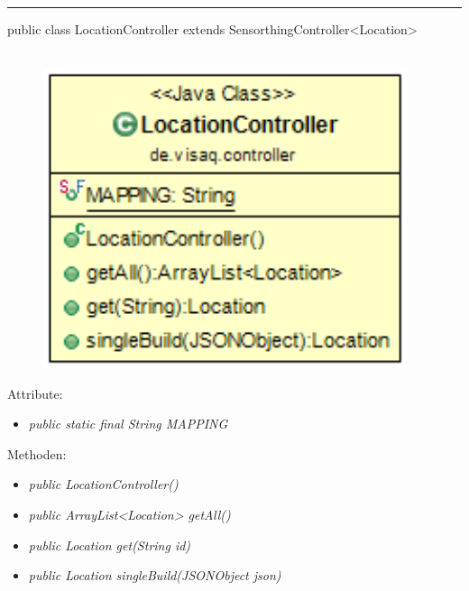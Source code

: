 \rule{\textwidth}{0.4pt}
public class LocationController extends SensorthingController<Location>
\\\\
\begin{minipage}{0.3\textwidth}
    \begin{figure}[H]
        {\centering\includegraphics[width=0.95\textwidth]{media/backend/controller/classes/LocationController.png}}
    \end{figure}
    \end{minipage} \hfill
\begin{minipage}{0.7\textwidth}
\end{minipage}

Attribute:
\begin{itemize}
    \item \emph{public static final String MAPPING} \mappingDescription
\end{itemize}
Methoden:
\begin{itemize}
    \item \emph{public LocationController()}
    \item \emph{public ArrayList<Location> getAll()}
    \extendsSensorthingController
    \item \emph{public Location get(String id)}
    \extendsSensorthingController
    \item \emph{public Location singleBuild(JSONObject json)}
    \extendsSensorthingController
\end{itemize}

